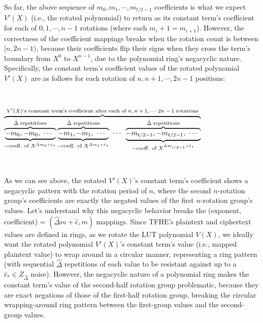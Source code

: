 So far, the above sequence of $m_0, m_1, \cdots, m_{{t}/{2} - 1}$ coefficients is what we expect $V'(X)$ (i.e., the rotated polynomial) to return as its constant term's coefficient for each of $0, 1, \cdots, n-1$ rotations (where each $m_i + 1 = m_{i+1}$). However, the correctness of the coefficient mappings breaks when the rotation count is between $[n, 2n -1)$, because their coefficients flip their signs when they cross the term's boundary from $X^0$ to $X^{n-1}$, due to the polynomial ring's negacyclic nature. Specifically, the constant term's coefficient values of the rotated polynomial $V'(X)$ are as follows for each rotation of $n, n+1, \cdots, 2n-1$ positions:

$ $

$\overbrace{\overbrace{\underbrace{-m_{0}, -m_{0}, \text{ } \text{$\cdots$} \text{ }}_{-\text{coeff. of } X^{\hat{\Delta}m_{0} + \hat{e}_*}}}^{\hat{\Delta} \text{ repetitions}} \overbrace{\underbrace{-m_{1}, -m_{1}, \text{ } \text{$\cdots$} \text{ }}_{-\text{coeff. of } X^{\hat{\Delta}m_{1} + \hat{e}_*}}}^{\hat{\Delta} \text{ repetitions}} \text{ } \text{$\cdots$} \text{ } \overbrace{\underbrace{-m_{t/2 - 1}, -m_{t/2 - 1}, \text{ } \text{$\cdots$} \text{ }}_{-\text{coeff. of } X^{\hat{\Delta}m_{t/2 - 1} + \hat{e}_*} }}^{\hat{\Delta} \text{ repetitions}}}^{\text{$V'(X)$'s constant term's coefficient after each of $n, n+1, \cdots 2n-1$ rotations}}$ 

$ $

As we can see above, the rotated $V'(X)$'s constant term's coefficient shows a negacyclic pattern with the rotation period of $n$, where the second $n$-rotation group's coefficients are exactly the negated values of the first $n$-rotation group's values. Let's understand why this negacyclic behavior breaks the (exponent, coefficient) = $(\hat{\Delta} m + \hat{e}, m)$ mappings. Since TFHE's plaintext and ciphertext values are defined in rings, as we rotate the LUT polynomial $V(X)$, we ideally want the rotated polynomial $V'(X)$'s constant term's value (i.e., mapped plaintext value) to wrap around in a circular manner, representing a ring pattern (with sequential $\hat{\Delta}$ repetitions of each value to be resistant against up to a $\hat{e}_* \in Z_{\hat{\Delta}}$ noise). However, the negacyclic nature of a polynomial ring makes the constant term's value of the second-half rotation group problematic, because they are exact negations of those of the first-half rotation group, breaking the circular wrapping-around ring pattern between the first-group values and the second-group values. 

